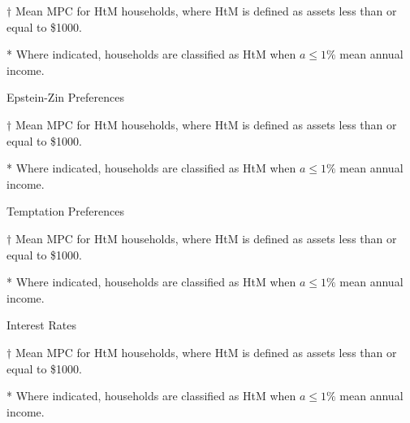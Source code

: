 \documentclass[9pt]{extarticle}
\begin{document}
\begin{table}[h]
\begin{threeparttable}
\begin{table}[h]
\begin{threeparttable}
\begin{tablenotes}
	\item[$\dagger$] Mean MPC for HtM households, where HtM is defined as assets less than or equal to \$1000.
	\item[*] Where indicated, households are classified as HtM when $a \leq 1\%$ mean annual income.
\end{tablenotes}
\end{threeparttable}
\end{table}

\begin{table}[h]
\caption{Epstein-Zin Preferences}
\begin{threeparttable}
\centering


\begin{tablenotes}
	\item[$\dagger$] Mean MPC for HtM households, where HtM is defined as assets less than or equal to \$1000.
	\item[*] Where indicated, households are classified as HtM when $a \leq 1\%$ mean annual income.
\end{tablenotes}
\end{threeparttable}
\end{table}

\begin{table}[h]
\caption{Temptation Preferences}
\begin{threeparttable}
\centering


\begin{tablenotes}
	\item[$\dagger$] Mean MPC for HtM households, where HtM is defined as assets less than or equal to \$1000.
	\item[*] Where indicated, households are classified as HtM when $a \leq 1\%$ mean annual income.
\end{tablenotes}
\end{threeparttable}
\end{table}

\begin{table}[h]
\caption{Interest Rates}
\begin{threeparttable}
\centering


\begin{tablenotes}
	\item[$\dagger$] Mean MPC for HtM households, where HtM is defined as assets less than or equal to \$1000.
	\item[*] Where indicated, households are classified as HtM when $a \leq 1\%$ mean annual income.
\end{tablenotes}
\end{threeparttable}
\end{table}


\end{threeparttable}
\end{table}
\end{document}
